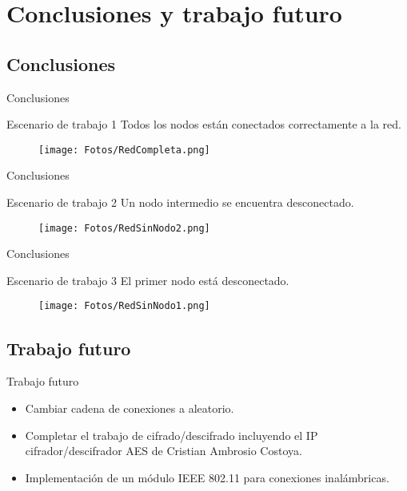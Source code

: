 \documentclass[aspectratio=169]{beamer}
\begin{document}
\section{Conclusiones y trabajo futuro}
\subsection{Conclusiones}
\begin{frame}{Conclusiones}
\begin{block}{Escenario de trabajo 1}
	Todos los nodos están conectados correctamente a la red.
	\begin{figure}[h]
		\centering
		\texttt{[image: Fotos/RedCompleta.png]}
	\end{figure}
\end{block}
\end{frame}

\begin{frame}{Conclusiones}
\begin{block}{Escenario de trabajo 2}
	Un nodo intermedio se encuentra desconectado.
	\begin{figure}[h]
		\centering
		\texttt{[image: Fotos/RedSinNodo2.png]}
	\end{figure}
\end{block}
\end{frame}

\begin{frame}{Conclusiones}
\begin{block}{Escenario de trabajo 3}
	El primer nodo está desconectado.
	\begin{figure}[h]
		\centering
		\texttt{[image: Fotos/RedSinNodo1.png]}
	\end{figure}
\end{block}
\end{frame}

\subsection{Trabajo futuro}
\begin{frame}{Trabajo futuro}
\begin{itemize}
	\item Cambiar cadena de conexiones a aleatorio.
	\item Completar el trabajo de cifrado/descifrado incluyendo el IP cifrador/descifrador AES de Cristian Ambrosio Costoya.
	\item Implementación de un módulo IEEE 802.11 para conexiones inalámbricas.
\end{itemize}
\end{frame}
\end{document}
